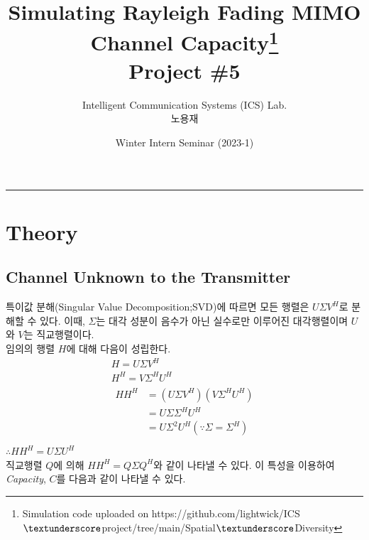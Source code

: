 \documentclass{article}
\title{Simulating Rayleigh Fading MIMO Channel Capacity\thanks{Simulation code uploaded on https://github.com/lightwick/ICS$\textunderscore$project/tree/main/Spatial$\textunderscore$Diversity}\\
\large Project \#5}
\author{Intelligent Communication Systems (ICS) Lab.\\노용재}
\date{Winter Intern Seminar (2023-1)}
\begin{document}
\maketitle
\tableofcontents
\vspace{0.5cm}
\hrule
\vspace{0.5cm}

\section{Theory}
\subsection{Channel Unknown to the Transmitter}
특이값 분해(Singular Value Decomposition;SVD)에 따르면 모든 행렬은 $U\Sigma V^H$로 분해할 수 있다.
이때, $\Sigma$는 대각 성분이 음수가 아닌 실수로만 이루어진 대각행렬이며 $U$와 $V$는 직교행렬이다.\\
임의의 행렬 $H$에 대해 다음이 성립한다.
\begin{gather}
H=U\Sigma V^H\\
H^H = V \Sigma^H U^H\\
\begin{split}
HH^H&=(U\Sigma V^H)(V \Sigma^H U^H)\\
&=U\Sigma \Sigma^H U^H\\
&=U\Sigma^2 U^H (\because \Sigma=\Sigma^H)\\
\end{split}
\end{gather}
\hspace{10cm}$\therefore HH^H=U\Sigma U^H$\\

직교행렬 $Q$에 의해 $HH^H=Q\Sigma Q^H$와 같이 나타낼 수 있다. 이 특성을 이용하여 \textsl{Capacity}, $C$를 다음과 같이 나타낼 수 있다.
\end{document}
